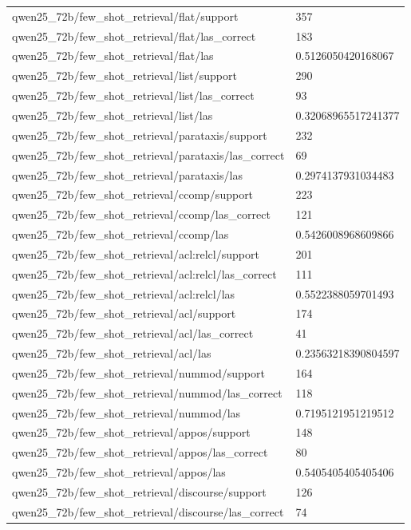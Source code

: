 \begin{tabular}{ll}
qwen25\_72b/few\_shot\_retrieval/flat/support & 357 \\
qwen25\_72b/few\_shot\_retrieval/flat/las\_correct & 183 \\
qwen25\_72b/few\_shot\_retrieval/flat/las & 0.5126050420168067 \\
qwen25\_72b/few\_shot\_retrieval/list/support & 290 \\
qwen25\_72b/few\_shot\_retrieval/list/las\_correct & 93 \\
qwen25\_72b/few\_shot\_retrieval/list/las & 0.32068965517241377 \\
qwen25\_72b/few\_shot\_retrieval/parataxis/support & 232 \\
qwen25\_72b/few\_shot\_retrieval/parataxis/las\_correct & 69 \\
qwen25\_72b/few\_shot\_retrieval/parataxis/las & 0.2974137931034483 \\
qwen25\_72b/few\_shot\_retrieval/ccomp/support & 223 \\
qwen25\_72b/few\_shot\_retrieval/ccomp/las\_correct & 121 \\
qwen25\_72b/few\_shot\_retrieval/ccomp/las & 0.5426008968609866 \\
qwen25\_72b/few\_shot\_retrieval/acl:relcl/support & 201 \\
qwen25\_72b/few\_shot\_retrieval/acl:relcl/las\_correct & 111 \\
qwen25\_72b/few\_shot\_retrieval/acl:relcl/las & 0.5522388059701493 \\
qwen25\_72b/few\_shot\_retrieval/acl/support & 174 \\
qwen25\_72b/few\_shot\_retrieval/acl/las\_correct & 41 \\
qwen25\_72b/few\_shot\_retrieval/acl/las & 0.23563218390804597 \\
qwen25\_72b/few\_shot\_retrieval/nummod/support & 164 \\
qwen25\_72b/few\_shot\_retrieval/nummod/las\_correct & 118 \\
qwen25\_72b/few\_shot\_retrieval/nummod/las & 0.7195121951219512 \\
qwen25\_72b/few\_shot\_retrieval/appos/support & 148 \\
qwen25\_72b/few\_shot\_retrieval/appos/las\_correct & 80 \\
qwen25\_72b/few\_shot\_retrieval/appos/las & 0.5405405405405406 \\
qwen25\_72b/few\_shot\_retrieval/discourse/support & 126 \\
qwen25\_72b/few\_shot\_retrieval/discourse/las\_correct & 74 \\

\end{tabular}
